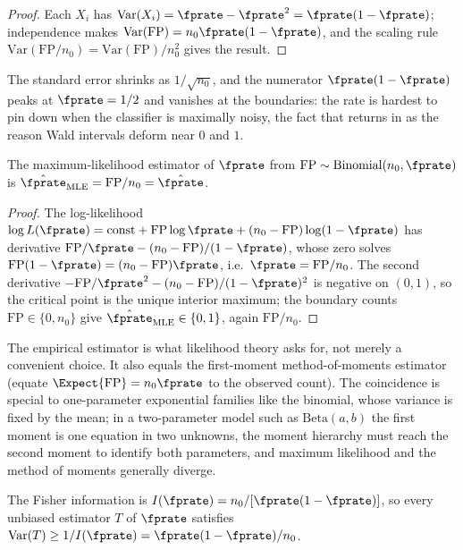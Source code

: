 \begin{proof}
Each $X_i$ has $\mathrm{Var}(X_i) = \fprate - \fprate^2 = \fprate(1 -
\fprate)$; independence makes $\mathrm{Var}(\mathrm{FP}) = n_0 \fprate(1 -
\fprate)$, and the scaling rule $\mathrm{Var}(\mathrm{FP}/n_0) =
\mathrm{Var}(\mathrm{FP})/n_0^2$ gives the result.
\end{proof}

The standard error shrinks as $1/\sqrt{n_0}$, and the numerator $\fprate(1 -
\fprate)$ peaks at $\fprate = 1/2$ and vanishes at the boundaries: the rate is
hardest to pin down when the classifier is maximally noisy, the fact that
returns in  as the reason Wald intervals deform
near $0$ and $1$.

\begin{proposition}
\label{prop:binomial-mle}
The maximum-likelihood estimator of $\fprate$ from $\mathrm{FP} \sim
\mathrm{Binomial}(n_0, \fprate)$ is $\hat{\fprate}_{\mathrm{MLE}} =
\mathrm{FP}/n_0 = \hat{\fprate}$.
\end{proposition}

\begin{proof}
The log-likelihood $\log L(\fprate) = \mathrm{const} + \mathrm{FP} \log
\fprate + (n_0 - \mathrm{FP}) \log(1 - \fprate)$ has derivative
$\mathrm{FP}/\fprate - (n_0 - \mathrm{FP})/(1 - \fprate)$, whose zero solves
$\mathrm{FP}(1 - \fprate) = (n_0 - \mathrm{FP})\fprate$, i.e.\ $\fprate =
\mathrm{FP}/n_0$. The second derivative $-\mathrm{FP}/\fprate^2 - (n_0 -
\mathrm{FP})/(1 - \fprate)^2$ is negative on $(0,1)$, so the critical point is
the unique interior maximum; the boundary counts $\mathrm{FP} \in \{0, n_0\}$
give $\hat\fprate_{\mathrm{MLE}} \in \{0, 1\}$, again $\mathrm{FP}/n_0$.
\end{proof}

The empirical estimator is what likelihood theory asks for, not merely a
convenient choice. It also equals the first-moment method-of-moments estimator
(equate $\Expect{\mathrm{FP}} = n_0 \fprate$ to the observed count). The
coincidence is special to one-parameter exponential families like the
binomial, whose variance is fixed by the mean; in a two-parameter model such
as $\mathrm{Beta}(a, b)$ the first moment is one equation in two unknowns, the
moment hierarchy must reach the second moment to identify both parameters, and
maximum likelihood and the method of moments generally diverge.

\begin{proposition}
\label{prop:fisher-information}
The Fisher information is $I(\fprate) = n_0 / [\fprate(1 - \fprate)]$, so every
unbiased estimator $T$ of $\fprate$ satisfies $\mathrm{Var}(T) \ge 1/I(\fprate)
= \fprate(1 - \fprate)/n_0$.
\end{proposition}

